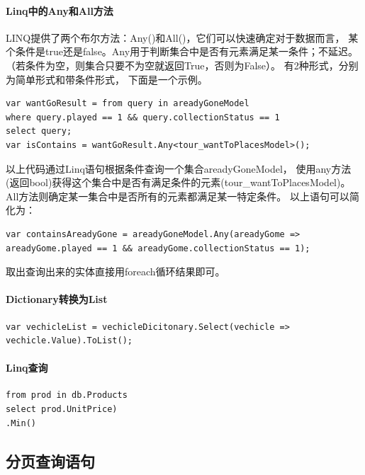 \documentclass{book}
\begin{document}
\paragraph{Linq中的Any和All方法}

LINQ提供了两个布尔方法：Any()和All()，它们可以快速确定对于数据而言，
某个条件是true还是false。Any用于判断集合中是否有元素满足某一条件；不延迟。
（若条件为空，则集合只要不为空就返回True，否则为False）。
有2种形式，分别为简单形式和带条件形式，
下面是一个示例。

\begin{lstlisting}[language={[Sharp]C}]
var wantGoResult = from query in areadyGoneModel
where query.played == 1 && query.collectionStatus == 1
select query;
var isContains = wantGoResult.Any<tour_wantToPlacesModel>();
\end{lstlisting}

以上代码通过Linq语句根据条件查询一个集合areadyGoneModel，
使用any方法(返回bool)获得这个集合中是否有满足条件的元素(tour\_wantToPlacesModel)。
All方法则确定某一集合中是否所有的元素都满足某一特定条件。
以上语句可以简化为：

\begin{lstlisting}[language={[Sharp]C}]
var containsAreadyGone = areadyGoneModel.Any(areadyGome => areadyGome.played == 1 && areadyGome.collectionStatus == 1);
\end{lstlisting}

取出查询出来的实体直接用foreach循环结果即可。

\paragraph{Dictionary转换为List}

\begin{lstlisting}[language={[Sharp]C}]
var vechicleList = vechicleDicitonary.Select(vechicle => vechicle.Value).ToList();
\end{lstlisting}

\paragraph{Linq查询}

\begin{lstlisting}[language={[Sharp]C}]
from prod in db.Products
select prod.UnitPrice)
.Min()
\end{lstlisting}

\subsection{分页查询语句}
\end{document}
